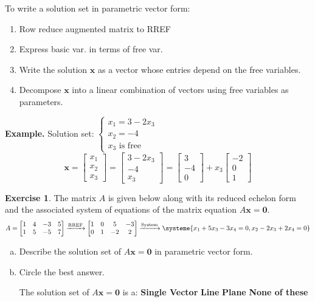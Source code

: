 \documentclass[10pt]{book}
\newcommand{\boxcolor}{gray!30}
\newenvironment{boxme}{\begin{mdframed}[backgroundcolor=\boxcolor,linewidth=0pt,nobreak=true]}{\end{mdframed}}
\theoremstyle{definition}
\newtheorem{exercise}{Exercise}[section]
\newcommand{\vect}[1]{\ensuremath{\boldsymbol{\mathbf{#1}}}}
\newcommand{\Axz}{A\vect{x}=\vect{0}}
\begin{document}
\begin{boxme}
	\begin{multicols}{2}
	To write a solution set in parametric vector form:
	\begin{enumerate}[(1)]\itemsep0em 
		\item Row reduce augmented matrix to RREF
		\item Express basic var. in terms of free var.
		\item Write the solution $\vect{x}$ as a vector whose entries depend on the free variables.
		\item Decompose $\vect{x}$ into a linear combination of vectors using free variables as parameters.
	\end{enumerate}
	
	\columnbreak
	
	\textbf{Example.}
	Solution set: $\begin{cases}x_1=3-2x_3 \\ x_2 = -4 \\ x_3 \text{ is free}\end{cases}$
	$$\vect{x}=\begin{bmatrix}x_1\\x_2\\x_3\end{bmatrix}
	=\begin{bmatrix}3-2x_3\\-4\\x_3\end{bmatrix}
	=\begin{bmatrix}3\\-4\\0\end{bmatrix} +x_3\begin{bmatrix}-2\\0\\1\end{bmatrix}$$
	\end{multicols}
\end{boxme}
\begin{exercise} %
	The matrix $A$ is given below along with its reduced echelon form and the associated system of equations of the matrix equation $A\vect{x}=\vect{0}$.
	$$A=\begin{bmatrix}1&4&-3&5\\1&5&-5&7\end{bmatrix}\xrightarrow{\text{RREF}}
	\begin{bmatrix}1&0&5&-3\\0&1&-2&2\end{bmatrix}\xrightarrow{\text{System}}
	\systeme{x_1 + 5x_3 - 3x_4 = 0, x_2 - 2x_3 + 2x_4 = 0} $$
	\begin{enumerate}[(a)]
		\item Describe the solution set of $\Axz$ in parametric vector form.
		\vfill
		\item Circle the best answer. \par
		The solution set of $A\vect{x}=\vect{0}$ is a: \quad \textbf{Single Vector} \qquad \textbf{Line} \qquad \textbf{Plane} \qquad \textbf{None of these}
	\end{enumerate}
\end{exercise}
\end{document}
